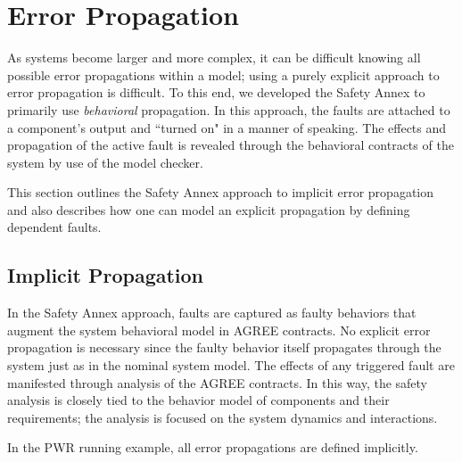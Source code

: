 \section{Error Propagation}
As systems become larger and more complex, it can be difficult knowing all possible error propagations within a model; using a purely explicit approach to error propagation is difficult. To this end, we developed the Safety Annex to primarily use \textit{behavioral} propagation. In this approach, the faults are attached to a component's output and ``turned on" in a manner of speaking. The effects and propagation of the active fault is revealed through the behavioral contracts of the system by use of the model checker. 

This section outlines the Safety Annex approach to implicit error propagation and also describes how one can model an explicit propagation by defining dependent faults. 

\subsection{Implicit Propagation}
In the Safety Annex approach, faults are captured as faulty behaviors that augment the system behavioral model in AGREE contracts. No explicit error propagation is necessary since the faulty behavior itself propagates through the system just as in the nominal system model. The effects of any triggered fault are manifested through analysis of the AGREE contracts. In this way, the safety analysis is closely tied to the behavior model of components and their requirements; the analysis is focused on the system dynamics and interactions. 

In the PWR running example, all error propagations are defined implicitly. 

